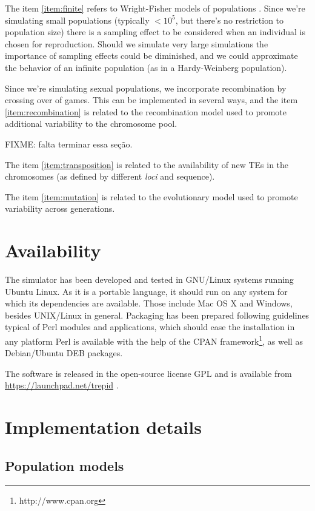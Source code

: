 \documentclass[10pt]{article}
\begin{document}
The item \ref{item:finite} refers to Wright-Fisher models of
populations \cite{HC98}. Since we're simulating small populations
(typically $<10^5$, but there's no restriction to population size)
there is a sampling effect to be considered when an individual is
chosen for reproduction. Should we simulate very large simulations the
importance of sampling effects could be diminished, and we could
approximate the behavior of an infinite population (as in a
Hardy-Weinberg population).

Since we're simulating sexual populations, we incorporate
recombination by crossing over of games. This can be implemented in
several ways, and the item \ref{item:recombination} is related to the
recombination model used to promote additional variability to the
chromosome pool.

FIXME: falta terminar essa seção.

The item \ref{item:transposition} is related to the availability of
new TEs in the chromosomes (as defined by different \emph{loci} and
sequence).


The item \ref{item:mutation} is related to the evolutionary model used
to promote variability across generations.




\section{Availability}
The simulator has been developed and tested in GNU/Linux systems
running Ubuntu Linux. As it is a portable language, it should run on
any system for which its dependencies are available. Those include Mac
OS X and Windows, besides UNIX/Linux in general. Packaging has been
prepared following guidelines typical of Perl modules and
applications, which should ease the installation in any platform Perl
is available with the help of the CPAN
framework\footnote{http://www.cpan.org}, as well as Debian/Ubuntu DEB
packages.

The software is released in the open-source license GPL and is
available from \url{https://launchpad.net/trepid} .


\section{Implementation details}
\label{sec:implementation}


\subsection{Population models}
\label{sec:impl_pop_models}
\end{document}
